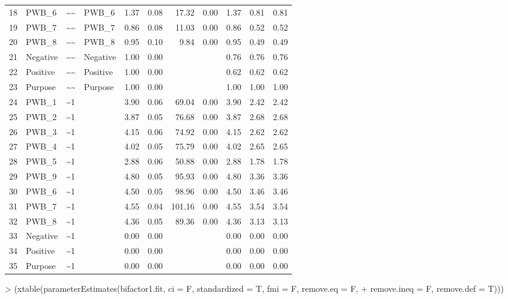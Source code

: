 \documentclass{article}
\begin{document}
\begin{table}[ht]
\begin{tabular}{rlllrrrrrrr}
  18 & PWB\_6 & \~{}\~{} & PWB\_6 & 1.37 & 0.08 & 17.32 & 0.00 & 1.37 & 0.81 & 0.81 \\ 
  19 & PWB\_7 & \~{}\~{} & PWB\_7 & 0.86 & 0.08 & 11.03 & 0.00 & 0.86 & 0.52 & 0.52 \\ 
  20 & PWB\_8 & \~{}\~{} & PWB\_8 & 0.95 & 0.10 & 9.84 & 0.00 & 0.95 & 0.49 & 0.49 \\ 
  21 & Negative & \~{}\~{} & Negative & 1.00 & 0.00 &  &  & 0.76 & 0.76 & 0.76 \\ 
  22 & Positive & \~{}\~{} & Positive & 1.00 & 0.00 &  &  & 0.62 & 0.62 & 0.62 \\ 
  23 & Purpose & \~{}\~{} & Purpose & 1.00 & 0.00 &  &  & 1.00 & 1.00 & 1.00 \\ 
  24 & PWB\_1 & \~{}1 &  & 3.90 & 0.06 & 69.04 & 0.00 & 3.90 & 2.42 & 2.42 \\ 
  25 & PWB\_2 & \~{}1 &  & 3.87 & 0.05 & 76.68 & 0.00 & 3.87 & 2.68 & 2.68 \\ 
  26 & PWB\_3 & \~{}1 &  & 4.15 & 0.06 & 74.92 & 0.00 & 4.15 & 2.62 & 2.62 \\ 
  27 & PWB\_4 & \~{}1 &  & 4.02 & 0.05 & 75.79 & 0.00 & 4.02 & 2.65 & 2.65 \\ 
  28 & PWB\_5 & \~{}1 &  & 2.88 & 0.06 & 50.88 & 0.00 & 2.88 & 1.78 & 1.78 \\ 
  29 & PWB\_9 & \~{}1 &  & 4.80 & 0.05 & 95.93 & 0.00 & 4.80 & 3.36 & 3.36 \\ 
  30 & PWB\_6 & \~{}1 &  & 4.50 & 0.05 & 98.96 & 0.00 & 4.50 & 3.46 & 3.46 \\ 
  31 & PWB\_7 & \~{}1 &  & 4.55 & 0.04 & 101.16 & 0.00 & 4.55 & 3.54 & 3.54 \\ 
  32 & PWB\_8 & \~{}1 &  & 4.36 & 0.05 & 89.36 & 0.00 & 4.36 & 3.13 & 3.13 \\ 
  33 & Negative & \~{}1 &  & 0.00 & 0.00 &  &  & 0.00 & 0.00 & 0.00 \\ 
  34 & Positive & \~{}1 &  & 0.00 & 0.00 &  &  & 0.00 & 0.00 & 0.00 \\ 
  35 & Purpose & \~{}1 &  & 0.00 & 0.00 &  &  & 0.00 & 0.00 & 0.00 \\ 
   \hline
\end{tabular}
\end{table}
> (xtable(parameterEstimates(bifactor1.fit, ci = F, standardized = T,  fmi = F, remove.eq = F, 
+                    remove.ineq = F, remove.def = T)))
\end{document}

